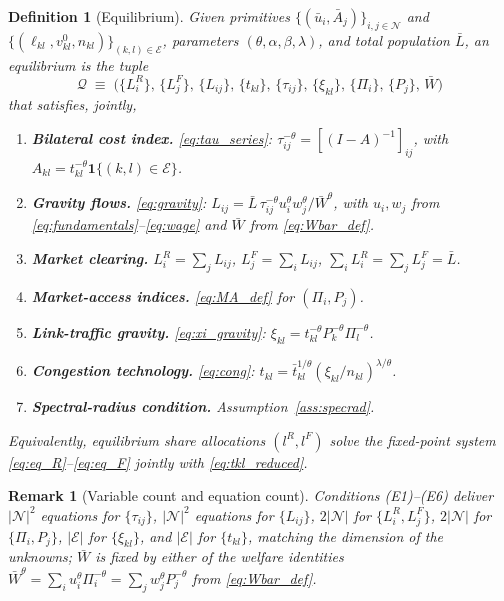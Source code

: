 \documentclass[12pt]{article}
\newtheorem{definition}{Definition}
\newtheorem{remark}{Remark}
\newcommand{\N}{\mathcal N}
\newcommand{\E}{\mathcal E}
\newcommand{\Lbar}{\bar L}
\newcommand{\Wbar}{\bar W}
\newcommand{\ubar}{\bar u}
\newcommand{\Abar}{\bar A}
\newcommand{\tbar}{\bar t}
\newcommand{\tkl}{t_{kl}}
\newcommand{\tijk}{\tau_{ij}}
\begin{document}
\begin{definition}[Equilibrium]\label{def:eq}
Given primitives $\{(\ubar_i,\Abar_j)\}_{i,j\in\N}$ and
$\{(\ell_{kl},v^{0}_{kl},n_{kl})\}_{(k,l)\in\E}$, parameters
$(\theta,\alpha,\beta,\lambda)$, and total population $\Lbar$, an
equilibrium is the tuple
\[
  \mathcal Q
  \;\equiv\;
  \bigl(
    \{L_i^R\},\,\{L_j^F\},\,\{L_{ij}\},\,
    \{\tkl\},\,\{\tijk\},\,\{\xi_{kl}\},\,
    \{\Pi_i\},\,\{P_j\},\,\Wbar
  \bigr)
\]
that satisfies, jointly,
\begin{enumerate}[label=(\textbf{E\arabic*}),leftmargin=3em,itemsep=0.25em]
\item \textbf{Bilateral cost index.} \eqref{eq:tau_series}:
  $\tijk^{-\theta}=[(I-A)^{-1}]_{ij}$, with
  $A_{kl}=\tkl^{-\theta}\mathbf 1\{(k,l)\in\E\}$.
\item \textbf{Gravity flows.} \eqref{eq:gravity}:
  $L_{ij}=\Lbar\,\tijk^{-\theta}u_i^{\theta}w_j^{\theta}/\Wbar^{\theta}$,
  with $u_i,w_j$ from \eqref{eq:fundamentals}--\eqref{eq:wage} and
  $\Wbar$ from \eqref{eq:Wbar_def}.
\item \textbf{Market clearing.} $L_i^R=\sum_j L_{ij}$,
  $L_j^F=\sum_i L_{ij}$, $\sum_i L_i^R=\sum_j L_j^F=\Lbar$.
\item \textbf{Market-access indices.} \eqref{eq:MA_def} for
  $(\Pi_i,P_j)$.
\item \textbf{Link-traffic gravity.} \eqref{eq:xi_gravity}:
  $\xi_{kl}=\tkl^{-\theta}P_k^{-\theta}\Pi_l^{-\theta}$.
\item \textbf{Congestion technology.} \eqref{eq:cong}:
  $\tkl=\tbar_{kl}^{1/\theta}(\xi_{kl}/n_{kl})^{\lambda/\theta}$.
\item \textbf{Spectral-radius condition.} Assumption~\ref{ass:specrad}.
\end{enumerate}
Equivalently, equilibrium share allocations $(l^R,l^F)$ solve the
fixed-point system
\eqref{eq:eq_R}--\eqref{eq:eq_F} jointly with
\eqref{eq:tkl_reduced}.
\end{definition}

\begin{remark}[Variable count and equation count]
Conditions (E1)--(E6) deliver
$|\N|^2$ equations for $\{\tijk\}$,
$|\N|^2$ equations for $\{L_{ij}\}$,
$2|\N|$ for $\{L_i^R,L_j^F\}$,
$2|\N|$ for $\{\Pi_i,P_j\}$,
$|\E|$ for $\{\xi_{kl}\}$, and
$|\E|$ for $\{\tkl\}$, matching the dimension of the unknowns;
$\Wbar$ is fixed by either of the welfare identities
$\Wbar^{\theta}=\sum_i u_i^{\theta}\Pi_i^{-\theta}=\sum_j
w_j^{\theta}P_j^{-\theta}$ from \eqref{eq:Wbar_def}.
\end{remark}
\end{document}
